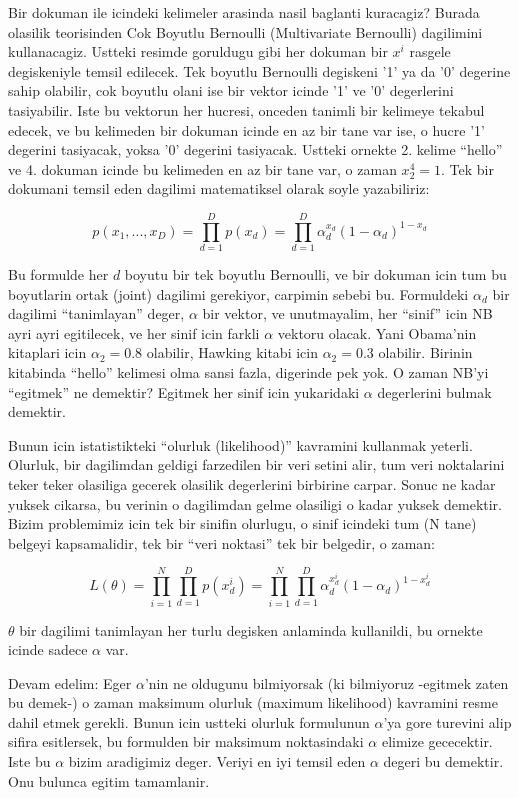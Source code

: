 \documentclass[12pt,fleqn]{article}\usepackage{../common}
\begin{document}
Bir dokuman ile icindeki kelimeler arasinda nasil baglanti kuracagiz?
Burada olasilik teorisinden Cok Boyutlu Bernoulli (Multivariate Bernoulli)
dagilimini kullanacagiz. Ustteki resimde goruldugu gibi her dokuman bir
$x^i$ rasgele degiskeniyle temsil edilecek. Tek boyutlu Bernoulli degiskeni
'1' ya da '0' degerine sahip olabilir, cok boyutlu olani ise bir vektor
icinde '1' ve '0' degerlerini tasiyabilir. Iste bu vektorun her hucresi,
onceden tanimli bir kelimeye tekabul edecek, ve bu kelimeden bir dokuman
icinde en az bir tane var ise, o hucre '1' degerini tasiyacak, yoksa '0'
degerini tasiyacak. Ustteki ornekte 2. kelime ``hello'' ve 4. dokuman
icinde bu kelimeden en az bir tane var, o zaman $x_2^4 = 1$. Tek bir
dokumani temsil eden dagilimi matematiksel olarak soyle yazabiliriz:

\[ p(x_1,...,x_{D}) = \prod_{d=1}^{D} p(x_d)=\prod_{d=1}^{D}
\alpha_d^{x_d}(1-\alpha_d)^{1-x_d} 
 \]

 Bu formulde her $d$ boyutu bir tek boyutlu Bernoulli, ve bir dokuman icin
 tum bu boyutlarin ortak (joint) dagilimi gerekiyor, carpimin sebebi
 bu. Formuldeki $\alpha_d$ bir dagilimi ``tanimlayan'' deger, $\alpha$ bir
 vektor, ve unutmayalim, her ``sinif'' icin NB ayri ayri egitilecek, ve her
 sinif icin farkli $\alpha$ vektoru olacak. Yani Obama'nin kitaplari icin
 $\alpha_2 = 0.8$ olabilir, Hawking kitabi icin $\alpha_2 = 0.3$
 olabilir. Birinin kitabinda ``hello'' kelimesi olma sansi fazla, digerinde
 pek yok. O zaman NB'yi ``egitmek'' ne demektir? Egitmek her sinif icin
 yukaridaki $\alpha$ degerlerini bulmak demektir.

 Bunun icin istatistikteki ``olurluk (likelihood)'' kavramini kullanmak
 yeterli. Olurluk, bir dagilimdan geldigi farzedilen bir veri setini alir,
 tum veri noktalarini teker teker olasiliga gecerek olasilik degerlerini
 birbirine carpar. Sonuc ne kadar yuksek cikarsa, bu verinin o dagilimdan
 gelme olasiligi o kadar yuksek demektir. Bizim problemimiz icin tek bir
 sinifin olurlugu, o sinif icindeki tum (N tane) belgeyi kapsamalidir, tek
 bir ``veri noktasi'' tek bir belgedir, o zaman:

\[ L(\theta) = \prod_{i=1}^N \prod_{d=1}^{D} p(x_d^i) = 
\prod_{i=1}^N \prod_{d=1}^{D} \alpha_d^{x_d^i}(1-\alpha_d)^{1-x_d^i}
 \]

$\theta$ bir dagilimi tanimlayan her turlu degisken anlaminda kullanildi, bu
ornekte icinde sadece $\alpha$ var.

Devam edelim: Eger $\alpha$'nin ne oldugunu bilmiyorsak (ki bilmiyoruz
-egitmek zaten bu demek-) o zaman maksimum olurluk (maximum likelihood)
kavramini resme dahil etmek gerekli. Bunun icin ustteki olurluk formulunun
$\alpha$'ya gore turevini alip sifira esitlersek, bu formulden bir maksimum
noktasindaki $\alpha$ elimize gececektir. Iste bu $\alpha$ bizim aradigimiz
deger. Veriyi en iyi temsil eden $\alpha$ degeri bu demektir. Onu bulunca
egitim tamamlanir.
\end{document}

